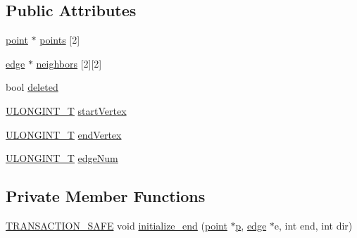 \subsection*{Public Attributes}
\begin{DoxyCompactItemize}
\item 
\hyperlink{classpoint}{point} $\ast$ \hyperlink{classedge_a91c2b7f577f370674bcd10b68359eb76}{points} \mbox{[}2\mbox{]}
\item 
\hyperlink{classedge}{edge} $\ast$ \hyperlink{classedge_a532dd309a5dd5e6406eb27853e123745}{neighbors} \mbox{[}2\mbox{]}\mbox{[}2\mbox{]}
\item 
bool \hyperlink{classedge_ab63afa3dd5864660c6eaf63958891526}{deleted}
\item 
\hyperlink{defs_8h_ade719b705ff384b386384c9385517e0b}{U\-L\-O\-N\-G\-I\-N\-T\-\_\-\-T} \hyperlink{classedge_a62a25ff44fe2c2b73bfa593f0280cd68}{start\-Vertex}
\item 
\hyperlink{defs_8h_ade719b705ff384b386384c9385517e0b}{U\-L\-O\-N\-G\-I\-N\-T\-\_\-\-T} \hyperlink{classedge_a7395b37cad4750710c5e2c425145df88}{end\-Vertex}
\item 
\hyperlink{defs_8h_ade719b705ff384b386384c9385517e0b}{U\-L\-O\-N\-G\-I\-N\-T\-\_\-\-T} \hyperlink{classedge_a3ce665ed3d79b2de5f601be06f9b96c4}{edge\-Num}
\end{DoxyCompactItemize}
\subsection*{Private Member Functions}
\begin{DoxyCompactItemize}
\item 
\hyperlink{common_8hpp_a77872cb9748b204f4b1c44ba6141b862}{T\-R\-A\-N\-S\-A\-C\-T\-I\-O\-N\-\_\-\-S\-A\-F\-E} void \hyperlink{classedge_af10ccfbaccf5198c07291317d70772fa}{initialize\-\_\-end} (\hyperlink{classpoint}{point} $\ast$\hyperlink{counted__ptr_8hpp_a5c9f59d7c24e3fd6ceae319a968fc3e0}{p}, \hyperlink{classedge}{edge} $\ast$e, int end, int dir)
\end{DoxyCompactItemize}


